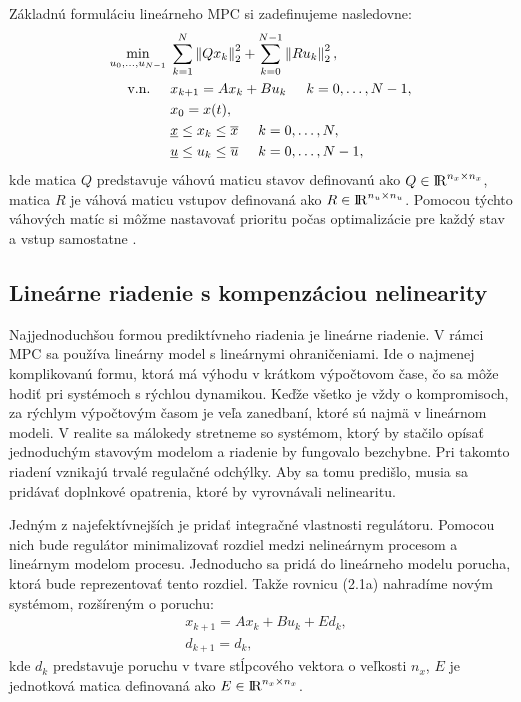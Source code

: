 Základnú formuláciu lineárneho MPC si zadefinujeme nasledovne:
\label{math:LinearneMPC}
\begin{subequations}
	\begin{align}
		\displaystyle \min_{u_0,...,u_{N-1}} \hspace{0.1cm} & 
		\sum_{k=1}^{N}\left\lVert Qx_k\right\rVert^{2}_{2}+\sum_{k=0}^{N-1}\left\lVert Ru_k\right\rVert^{2}_{2},\\
		\textrm{v.n.} \hspace{0.5cm} & x_{k+1} = Ax_{k}+Bu_{k}\hspace{0.5cm} k=0,\dots,N-1,\\
		& x_{0} = x(t),\\
		& \underline{x} \leq x_{k} \leq \overline{x}\hspace{0.5cm} k=0,\dots,N,\\
		& \underline{u} \leq u_{k} \leq \overline{u}\hspace{0.5cm} k=0,\dots,N-1,
	\end{align}
\end{subequations}
kde matica $Q$ predstavuje váhovú maticu stavov definovanú ako $Q \in {\rm I\!R}^{n_{x}\times n_{x}}$, matica $R$ je váhová maticu vstupov definovaná ako $R \in {\rm I\!R}^{n_{u}\times n_{u}}$. Pomocou týchto váhových matíc si môžme nastavovať prioritu počas optimalizácie pre každý stav a vstup samostatne \cite{bib11}. 

\subsection{Lineárne riadenie s kompenzáciou nelinearity}
\label{subse:LinearneMPCKomp}
Najjednoduchšou formou prediktívneho riadenia je lineárne riadenie. V rámci MPC sa používa lineárny model s lineárnymi ohraničeniami. Ide o najmenej komplikovanú formu, ktorá má výhodu v krátkom výpočtovom čase, čo sa môže hodiť pri systémoch s rýchlou dynamikou. Keďže všetko je vždy o kompromisoch, za rýchlym výpočtovým časom je veľa zanedbaní, ktoré sú najmä v lineárnom modeli. V realite sa málokedy stretneme so systémom, ktorý by stačilo opísať jednoduchým stavovým modelom a riadenie by fungovalo bezchybne. Pri takomto riadení vznikajú trvalé regulačné odchýlky. Aby sa tomu predišlo, musia sa pridávať doplnkové opatrenia, ktoré by vyrovnávali nelinearitu. 

Jedným z najefektívnejších je pridať integračné vlastnosti regulátoru. Pomocou nich bude regulátor minimalizovať rozdiel medzi nelineárnym procesom a lineárnym modelom procesu. Jednoducho sa pridá do lineárneho modelu porucha, ktorá bude reprezentovať tento rozdiel. Takže rovnicu (2.1a) nahradíme novým systémom, rozšíreným o poruchu:
\begin{subequations}
	\begin{align}
		&x_{k+1} = Ax_{k} + Bu_{k} + Ed_{k},\\
		&d_{k+1} = d_{k},
	\end{align}
\end{subequations}
kde $d_{k}$ predstavuje poruchu v tvare stĺpcového vektora o veľkosti $n_{x}$, $E$ je jednotková matica definovaná ako $E \in {\rm I\!R}^{n_{x}\times n_{x}}$.

